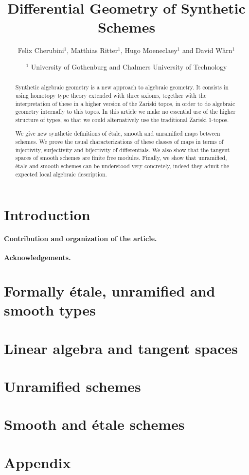 \documentclass{../util/zariski}
\title{Differential Geometry of Synthetic Schemes}
\author{Felix Cherubini$^1$, Matthias Ritter$^1$, Hugo Moeneclaey$^1$ and David Wärn$^1$}
\date{$^1$ University of Gothenburg and Chalmers University of Technology }
\begin{document}
\maketitle

\begin{abstract}
  Synthetic algebraic geometry is a new approach to algebraic geometry. It consists in using homotopy type theory extended with three axioms, together with the interpretation of these in a higher version of the Zariski topos, in order to do algebraic geometry internally to this topos. In this article we make no essential use of the higher structure of types, so that we could alternatively use the traditional Zariski 1-topos.
  
  We give new synthetic definitions of étale, smooth and unramified maps between schemes.
  We prove the usual characterizations of these classes of maps in terms of injectivity, surjectivity and bijectivity of differentials. We also show that the tangent spaces of smooth schemes are finite free modules.
  Finally, we show that unramified, étale and smooth schemes can be understood very concretely, indeed they admit the expected local algebraic description.
\end{abstract}

\tableofcontents

\section*{Introduction}

\paragraph{Contribution and organization of the article. }

\paragraph{Acknowledgements.}


\section{Formally étale, unramified and smooth types}


\section{Linear algebra and tangent spaces}


\section{Unramified schemes}


\section{Smooth and étale schemes}


\pagebreak
\appendix
\section{Appendix}


\printindex

\printbibliography
\end{document}
